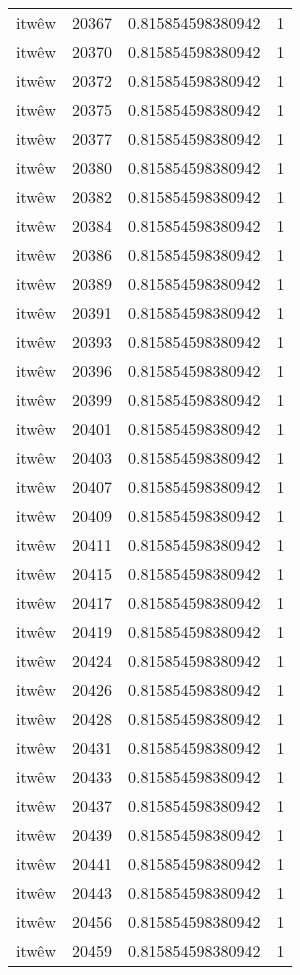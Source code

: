 \begin{longtable}{llll}
itwêw & 20367 & 0.815854598380942 & 1 \\
itwêw & 20370 & 0.815854598380942 & 1 \\
itwêw & 20372 & 0.815854598380942 & 1 \\
itwêw & 20375 & 0.815854598380942 & 1 \\
itwêw & 20377 & 0.815854598380942 & 1 \\
itwêw & 20380 & 0.815854598380942 & 1 \\
itwêw & 20382 & 0.815854598380942 & 1 \\
itwêw & 20384 & 0.815854598380942 & 1 \\
itwêw & 20386 & 0.815854598380942 & 1 \\
itwêw & 20389 & 0.815854598380942 & 1 \\
itwêw & 20391 & 0.815854598380942 & 1 \\
itwêw & 20393 & 0.815854598380942 & 1 \\
itwêw & 20396 & 0.815854598380942 & 1 \\
itwêw & 20399 & 0.815854598380942 & 1 \\
itwêw & 20401 & 0.815854598380942 & 1 \\
itwêw & 20403 & 0.815854598380942 & 1 \\
itwêw & 20407 & 0.815854598380942 & 1 \\
itwêw & 20409 & 0.815854598380942 & 1 \\
itwêw & 20411 & 0.815854598380942 & 1 \\
itwêw & 20415 & 0.815854598380942 & 1 \\
itwêw & 20417 & 0.815854598380942 & 1 \\
itwêw & 20419 & 0.815854598380942 & 1 \\
itwêw & 20424 & 0.815854598380942 & 1 \\
itwêw & 20426 & 0.815854598380942 & 1 \\
itwêw & 20428 & 0.815854598380942 & 1 \\
itwêw & 20431 & 0.815854598380942 & 1 \\
itwêw & 20433 & 0.815854598380942 & 1 \\
itwêw & 20437 & 0.815854598380942 & 1 \\
itwêw & 20439 & 0.815854598380942 & 1 \\
itwêw & 20441 & 0.815854598380942 & 1 \\
itwêw & 20443 & 0.815854598380942 & 1 \\
itwêw & 20456 & 0.815854598380942 & 1 \\
itwêw & 20459 & 0.815854598380942 & 1 \\

\end{longtable}
